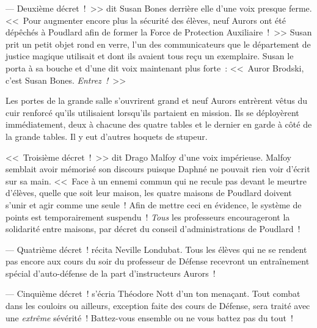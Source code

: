 --- Deuxième décret~!~>> dit Susan Bones derrière elle d'une voix presque ferme. <<~Pour augmenter encore plus la sécurité des élèves, neuf Aurors ont été dépêchés à Poudlard afin de former la Force de Protection Auxiliaire~!~>> Susan prit un petit objet rond en verre, l'un des communicateurs que le département de justice magique utilisait et dont ils avaient tous reçu un exemplaire. Susan le porta à sa bouche et d'une dit voix maintenant plus forte~: <<~Auror Brodski, c'est Susan Bones. \emph{Entrez~!}~>>

Les portes de la grande salle s'ouvrirent grand et neuf Aurors entrèrent vêtus du cuir renforcé qu'ils utilisaient lorsqu'ils partaient en mission. Ils se déployèrent immédiatement, deux à chacune des quatre tables et le dernier en garde à côté de la grande tables. Il y eut d'autres hoquets de stupeur.

<<~Troisième décret~!~>> dit Drago Malfoy d'une voix impérieuse. Malfoy semblait avoir mémorisé son discours puisque Daphné ne pouvait rien voir d'écrit sur sa main. <<~Face à un ennemi commun qui ne recule pas devant le meurtre d'élèves, quelle que soit leur maison, les quatre maisons de Poudlard doivent s'unir et agir comme une seule~! Afin de mettre ceci en évidence, le système de points est temporairement suspendu~! \emph{Tous} les professeurs encourageront la solidarité entre maisons, par décret du conseil d'administrations de Poudlard~!

--- Quatrième décret~! récita Neville Londubat. Tous les élèves qui ne se rendent pas encore aux cours du soir du professeur de Défense recevront un entraînement spécial d'auto-défense de la part d'instructeurs Aurors~!

--- Cinquième décret~! s'écria Théodore Nott d'un ton menaçant. Tout combat dans les couloirs ou ailleurs, exception faite des cours de Défense, sera traité avec une \emph{extrême} sévérité~! Battez-vous ensemble ou ne vous battez pas du tout~!

